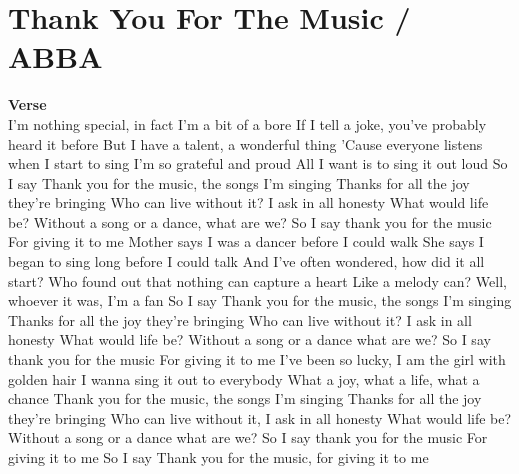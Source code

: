 \section{Thank You For The Music / ABBA}\label{sec:thankyouforthemusic}
\DmajorEasy
\Fmajor
\Gmajor
\Amajor


\textbf{Verse}\\

I'm nothing special, in fact I'm a bit of a bore
If I tell a joke, you've probably heard it before
But I have a talent, a wonderful thing
'Cause everyone listens when I start to sing
I'm so grateful and proud
All I want is to sing it out loud
So I say
Thank you for the music, the songs I'm singing
Thanks for all the joy they're bringing
Who can live without it? I ask in all honesty
What would life be?
Without a song or a dance, what are we?
So I say thank you for the music
For giving it to me
Mother says I was a dancer before I could walk
She says I began to sing long before I could talk
And I've often wondered, how did it all start?
Who found out that nothing can capture a heart
Like a melody can?
Well, whoever it was, I'm a fan
So I say
Thank you for the music, the songs I'm singing
Thanks for all the joy they're bringing
Who can live without it? I ask in all honesty
What would life be?
Without a song or a dance what are we?
So I say thank you for the music
For giving it to me
I've been so lucky, I am the girl with golden hair
I wanna sing it out to everybody
What a joy, what a life, what a chance
Thank you for the music, the songs I'm singing
Thanks for all the joy they're bringing
Who can live without it, I ask in all honesty
What would life be?
Without a song or a dance what are we?
So I say thank you for the music
For giving it to me
So I say
Thank you for the music, for giving it to me






